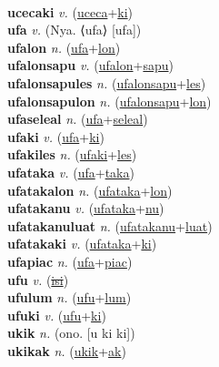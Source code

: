  \label{ucecalon} \\
\textbf{ucecaki} \textit{v.} (\hyperref[uceca]{uceca}+\hyperref[ki]{ki})
 \label{ucecaki} \\
\textbf{ufa} \textit{v.} (Nya. ⟨ufa⟩ [ufa])
 \label{ufa} \\
\textbf{ufalon} \textit{n.} (\hyperref[ufa]{ufa}+\hyperref[lon]{lon})
 \label{ufalon} \\
\textbf{ufalonsapu} \textit{v.} (\hyperref[ufalon]{ufalon}+\hyperref[sapu]{sapu})
 \label{ufalonsapu} \\
\textbf{ufalonsapules} \textit{n.} (\hyperref[ufalonsapu]{ufalonsapu}+\hyperref[les]{les})
 \label{ufalonsapules} \\
\textbf{ufalonsapulon} \textit{n.} (\hyperref[ufalonsapu]{ufalonsapu}+\hyperref[lon]{lon})
 \label{ufalonsapulon} \\
\textbf{ufaseleal} \textit{n.} (\hyperref[ufa]{ufa}+\hyperref[seleal]{seleal})
 \label{ufaseleal} \\
\textbf{ufaki} \textit{v.} (\hyperref[ufa]{ufa}+\hyperref[ki]{ki})
 \label{ufaki} \\
\textbf{ufakiles} \textit{n.} (\hyperref[ufaki]{ufaki}+\hyperref[les]{les})
 \label{ufakiles} \\
\textbf{ufataka} \textit{v.} (\hyperref[ufa]{ufa}+\hyperref[taka]{taka})
 \label{ufataka} \\
\textbf{ufatakalon} \textit{n.} (\hyperref[ufataka]{ufataka}+\hyperref[lon]{lon})
 \label{ufatakalon} \\
\textbf{ufatakanu} \textit{v.} (\hyperref[ufataka]{ufataka}+\hyperref[nu]{nu})
 \label{ufatakanu} \\
\textbf{ufatakanuluat} \textit{n.} (\hyperref[ufatakanu]{ufatakanu}+\hyperref[luat]{luat})
 \label{ufatakanuluat} \\
\textbf{ufatakaki} \textit{v.} (\hyperref[ufataka]{ufataka}+\hyperref[ki]{ki})
 \label{ufatakaki} \\
\textbf{ufapiac} \textit{n.} (\hyperref[ufa]{ufa}+\hyperref[piac]{piac})
 \label{ufapiac} \\
\textbf{ufu} \textit{v.} (\hyperref[isi]{\sout{isi}})
 \label{ufu} \\
\textbf{ufulum} \textit{n.} (\hyperref[ufu]{ufu}+\hyperref[lum]{lum})
 \label{ufulum} \\
\textbf{ufuki} \textit{v.} (\hyperref[ufu]{ufu}+\hyperref[ki]{ki})
 \label{ufuki} \\
\textbf{ukik} \textit{n.} (ono. [u ki ki])
 \label{ukik} \\
\textbf{ukikak} \textit{n.} (\hyperref[ukik]{ukik}+\hyperref[ak]{ak})
